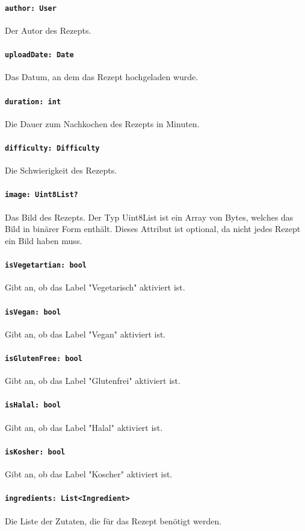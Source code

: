 \documentclass{entwurfsheft}
\begin{document}
\paragraph{\texttt{author: User}}
Der Autor des Rezepts.
\paragraph{\texttt{uploadDate: Date}}
Das Datum, an dem das Rezept hochgeladen wurde.
\paragraph{\texttt{duration: int}}
Die Dauer zum Nachkochen des Rezepts in Minuten.
\paragraph{\texttt{difficulty: Difficulty}}
Die Schwierigkeit des Rezepts.
\paragraph{\texttt{image: Uint8List?}}
Das Bild des Rezepts. Der Typ Uint8List ist ein Array von Bytes, welches das Bild in binärer Form enthält. Dieses Attribut ist optional, da nicht jedes Rezept ein Bild haben muss.
\paragraph{\texttt{isVegetartian: bool}}
Gibt an, ob das Label "Vegetarisch" aktiviert ist.
\paragraph{\texttt{isVegan: bool}}
Gibt an, ob das Label "Vegan" aktiviert ist.
\paragraph{\texttt{isGlutenFree: bool}}
Gibt an, ob das Label "Glutenfrei" aktiviert ist.
\paragraph{\texttt{isHalal: bool}}
Gibt an, ob das Label "Halal" aktiviert ist.
\paragraph{\texttt{isKosher: bool}}
Gibt an, ob das Label "Koscher" aktiviert ist.
\paragraph{\texttt{ingredients: List<Ingredient>}}
Die Liste der Zutaten, die für das Rezept benötigt werden.
\end{document}
